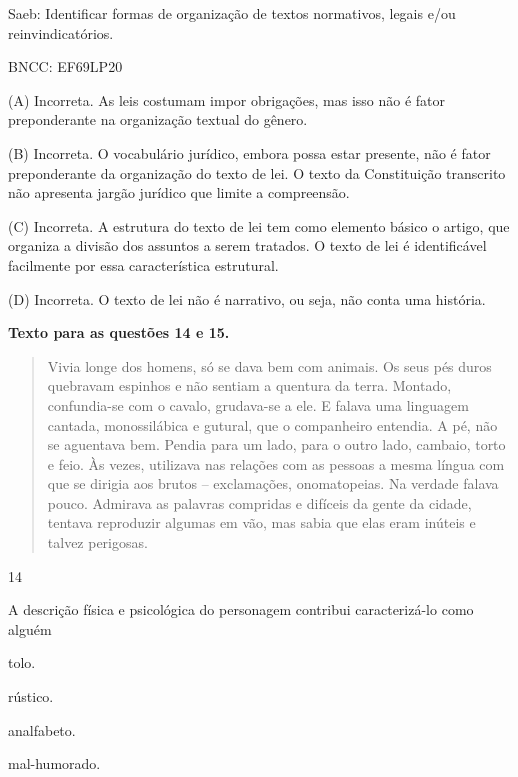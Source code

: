 Saeb: Identificar formas de organização de textos normativos, legais
e/ou reinvindicatórios.

BNCC: EF69LP20

(A) Incorreta. As leis costumam impor obrigações, mas isso não é fator
preponderante na organização textual do gênero.

(B) Incorreta. O vocabulário jurídico, embora possa estar presente, não
é fator preponderante da organização do texto de lei. O texto da
Constituição transcrito não apresenta jargão jurídico que limite a
compreensão.

(C) Incorreta. A estrutura do texto de lei tem como elemento básico o
artigo, que organiza a divisão dos assuntos a serem tratados. O texto de
lei é identificável facilmente por essa característica estrutural.

(D) Incorreta. O texto de lei não é narrativo, ou seja, não conta uma
história.

\textbf{Texto para as questões 14 e 15.}

\begin{quote}
Vivia longe dos homens, só se dava bem com animais. Os seus pés duros
quebravam espinhos e não sentiam a quentura da terra. Montado,
confundia-se com o cavalo, grudava-se a ele. E falava uma linguagem
cantada, monossilábica e gutural, que o companheiro entendia. A pé, não
se aguentava bem. Pendia para um lado, para o outro lado, cambaio, torto
e feio. Às vezes, utilizava nas relações com as pessoas a mesma língua
com que se dirigia aos brutos -- exclamações, onomatopeias. Na verdade
falava pouco. Admirava as palavras compridas e difíceis da gente da
cidade, tentava reproduzir algumas em vão, mas sabia que elas eram
inúteis e talvez perigosas.
\end{quote}


\num{14}

A descrição física e psicológica do personagem contribui caracterizá-lo
como alguém

\begin{escolha}
\item tolo.

\item rústico.

\item analfabeto.

\item mal-humorado.
\end{escolha}

